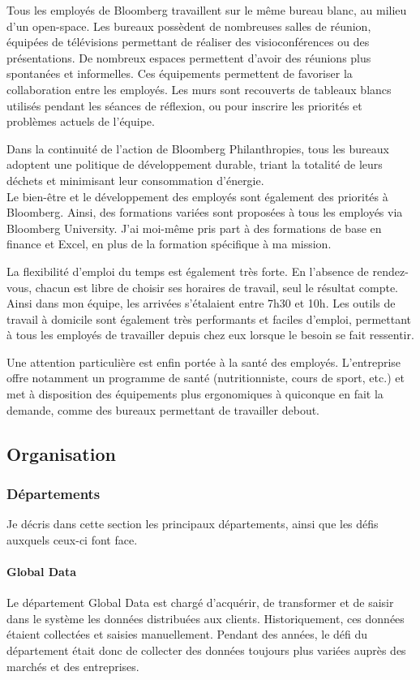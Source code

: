 \documentclass[11pt, oneside, titlepage, a4paper]{article}
\begin{document}
Tous les employés de Bloomberg travaillent sur le même bureau blanc, au milieu d'un open-space. Les bureaux possèdent de nombreuses salles de réunion, équipées de télévisions permettant de réaliser des visioconférences ou des présentations. De nombreux espaces permettent d'avoir des réunions plus spontanées et informelles. Ces équipements permettent de favoriser la collaboration entre les employés. Les murs sont recouverts de tableaux blancs utilisés pendant les séances de réflexion, ou pour inscrire les priorités et problèmes actuels de l'équipe.

Dans la continuité de l'action de Bloomberg Philanthropies, tous les bureaux adoptent une politique de développement durable, triant la totalité de leurs déchets et minimisant leur consommation d'énergie.
\\

Le bien-être et le développement des employés sont également des priorités à Bloomberg. Ainsi, des formations variées sont proposées à tous les employés via Bloomberg University. J'ai moi-même pris part à des formations de base en finance et Excel, en plus de la formation spécifique à ma mission.

La flexibilité d'emploi du temps est également très forte. En l'absence de rendez-vous, chacun est libre de choisir ses horaires de travail, seul le résultat compte. Ainsi dans mon équipe, les arrivées s'étalaient entre 7h30 et 10h. Les outils de travail à domicile sont également très performants et faciles d'emploi, permettant à tous les employés de travailler depuis chez eux lorsque le besoin se fait ressentir.

Une attention particulière est enfin portée à la santé des employés. L'entreprise offre notamment un programme de santé (nutritionniste, cours de sport, etc.) et met à disposition des équipements plus ergonomiques à quiconque en fait la demande, comme des bureaux permettant de travailler debout.
	\subsection{Organisation}
		\subsubsection{Départements}
Je décris dans cette section les principaux départements, ainsi que les défis auxquels ceux-ci font face.
\paragraph{Global Data}
Le département Global Data est chargé d'acquérir, de transformer et de saisir dans le système les données distribuées aux clients. Historiquement, ces données étaient collectées et saisies manuellement. Pendant des années, le défi du département était donc de collecter des données toujours plus variées auprès des marchés et des entreprises.
\end{document}
